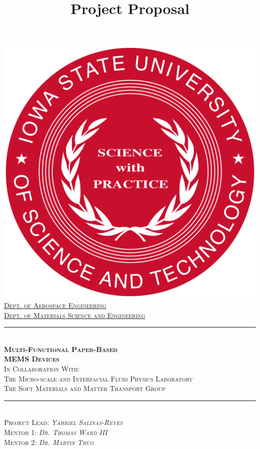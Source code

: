 \documentclass[12pt]{article}
\begin{document}
\title{Project Proposal}

\begin{titlepage}
	\centering
    \vspace*{0.2 cm}
    \includegraphics[scale = 0.15]{images/isu_seal.png}\\[1.0 cm]	%
    \textsc{\large\underline{Dept. of Aerospace Engineering}}\\[0.4 cm]
       \textsc{\large\underline{Dept. of Materials Science and Engineering}}\\[0.4 cm]
           \rule{\linewidth}{0.4 mm} \\[0.8 cm]
	\textsc{\LARGE\textbf{Multi-Functional Paper-Based}} \\[0.2cm]
 \textsc{\LARGE\textbf{MEMS Devices}} \\[0.4 cm]
\textsc{\small In Collaboration With:}\\[0.2 cm]
\textsc{\small The Micro-scale and Interfacial Fluid Physics Laboratory}\\[0.2 cm]
\textsc{\small The Soft Materials and Matter Transport Group}\\[0.4 cm]
\rule{\linewidth}{0.4 mm} \\[0.6 cm]
    \textsc{\large Project Lead: \emph{Yahriel Salinas-Reyes}}\\[0.2 cm]
    \textsc{\large Mentor 1: \emph{Dr. Thomas Ward III}}\\[0.2 cm]
    \textsc{\large Mentor 2: \emph{Dr. Martin Thuo}}\\[2.5 cm]


\end{titlepage}
\end{document}
